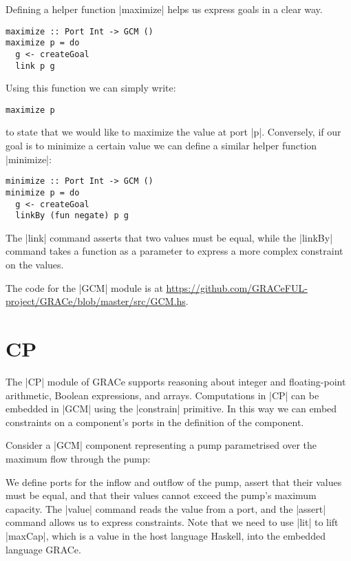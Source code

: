 \documentclass[a4paper]{article}
\begin{document}
Defining a helper function |maximize| helps us express goals in a clear way.
\begin{verbatim}
maximize :: Port Int -> GCM ()
maximize p = do
  g <- createGoal
  link p g
\end{verbatim}
Using this function we can simply write:
\begin{verbatim}
maximize p
\end{verbatim}
to state that we would like to maximize the value at port |p|. Conversely, if
our goal is to minimize a certain value we can define a similar helper function
|minimize|:
\begin{verbatim}
minimize :: Port Int -> GCM ()
minimize p = do
  g <- createGoal
  linkBy (fun negate) p g
\end{verbatim}
The |link| command asserts that two values must be equal, while the |linkBy|
command takes a function as a parameter to express a more complex constraint on
the values.

The code for the |GCM| module is at \url{https://github.com/GRACeFUL-project/GRACe/blob/master/src/GCM.hs}.
\section{CP}

The |CP| module of GRACe supports reasoning about integer and floating-point
arithmetic, Boolean expressions, and arrays. Computations in |CP| can be
embedded in |GCM| using the |constrain| primitive. In this way we can embed
constraints on a component's ports in the definition of the component.

Consider a |GCM| component representing a pump parametrised over the maximum
flow through the pump:

We define ports for the inflow and outflow of the pump, assert that their values
must be equal, and that their values cannot exceed the pump's maximum capacity.
The |value| command reads the value from a port, and the |assert| command allows
us to express constraints. Note that we need to use |lit| to lift |maxCap|,
which is a value in the host language Haskell, into the embedded language GRACe.
\end{document}
